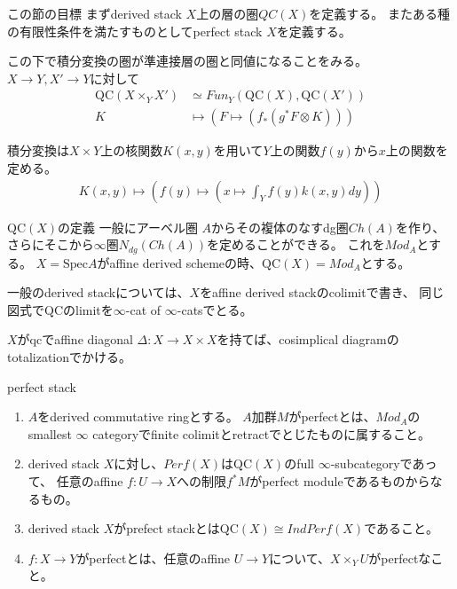 \documentclass[dvipdfmx]{beamer}
\newcommand{\QC}{\mathrm{QC}}
\newcommand{\spec}{\mathrm{Spec}}
\begin{document}
\begin{frame}{この節の目標}
まずderived stack $X$上の層の圏$QC(X)$を定義する。
またある種の有限性条件を満たすものとしてperfect stack $X$を定義する。

この下で積分変換の圏が準連接層の圏と同値になることをみる。
$X \to Y, X' \to Y$に対して
\begin{align*}
\QC(X\times_YX') &\simeq Fun_Y(\QC(X), \QC(X'))\\
K &\mapsto (F \mapsto (f_*(g^*F\otimes K)))
\end{align*}

積分変換は$X\times Y$上の核関数$K(x, y)$を用いて$Y$上の関数$f(y)$から$x$上の関数を定める。
\begin{align*}
K(x,y) \mapsto (f(y) \mapsto (x \mapsto \int_Yf(y)k(x,y)dy))
\end{align*}
\end{frame}

\begin{frame}{$\QC(X)$の定義}
一般にアーベル圏 $A$からその複体のなすdg圏$Ch(A)$を作り、
さらにそこから$\infty$圏$N_{dg}(Ch(A))$を定めることができる。
これを$Mod_A$とする。
$X=\spec A$がaffine derived schemeの時、$\QC(X)=Mod_A$とする。

一般のderived stackについては、$X$をaffine derived stackのcolimitで書き、
同じ図式で$\QC$のlimitを$\infty$-cat of $\infty$-catsでとる。

$X$がqcでaffine diagonal $\Delta:X \to X\times X$を持てば、cosimplical diagramのtotalizationでかける。
\end{frame}

\begin{frame}{perfect stack}
\begin{dfn}
\begin{enumerate}
\item $A$をderived commutative ringとする。
$A$加群$M$がperfectとは、$Mod_A$のsmallest $\infty$ categoryでfinite colimitとretractでとじたものに属すること。
\item derived stack $X$に対し、$Perf(X)$は$\QC(X)$のfull $\infty$-subcategoryであって、
任意のaffine $f:U \to X$への制限$f^*M$がperfect moduleであるものからなるもの。
\item derived stack $X$がprefect stackとは$\QC(X)\cong IndPerf(X)$であること。
\item $f:X \to Y$がperfectとは、任意のaffine $U \to Y$について、$X \times_Y U$がperfectなこと。
\end{enumerate}
\end{dfn}
\end{frame}
\end{document}
